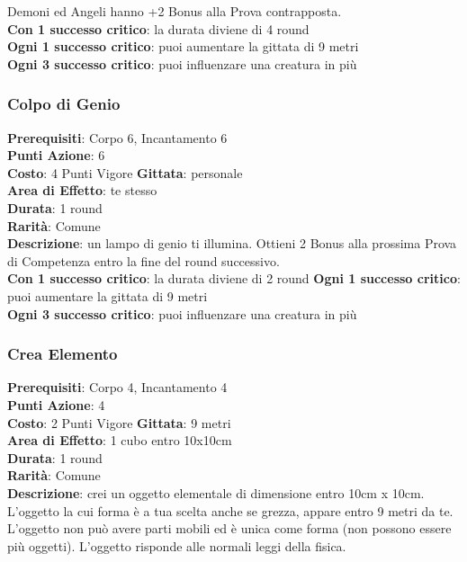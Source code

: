 \documentclass[12pt,a4paper,twoside,openany]{book}
\begin{document}
\begin{multicols}{2}
Demoni ed Angeli hanno +2 Bonus alla Prova contrapposta.\\
\textbf{Con 1 successo critico}: la durata diviene di 4 round\\
\textbf{Ogni 1 successo critico}: puoi aumentare la gittata di 9 metri\\
\textbf{Ogni 3 successo critico}: puoi influenzare una creatura in più


\subsubsection*{Colpo di Genio}
\textbf{Prerequisiti}: Corpo 6, Incantamento 6\\
\textbf{Punti Azione}: 6\\
\textbf{Costo}: 4 Punti Vigore
\textbf{Gittata}: personale\\
\textbf{Area di Effetto}: te stesso\\
\textbf{Durata}: 1 round\\
\textbf{Rarità}: Comune\\
\textbf{Descrizione}: un lampo di genio ti illumina. 
Ottieni 2 Bonus alla prossima Prova di Competenza entro la fine del round successivo.\\
\textbf{Con 1 successo critico}: la durata diviene di 2 round
\textbf{Ogni 1 successo critico}: puoi aumentare la gittata di 9 metri\\
\textbf{Ogni 3 successo critico}: puoi influenzare una creatura in più

\subsubsection*{Crea Elemento}
\textbf{Prerequisiti}: Corpo 4, Incantamento 4\\
\textbf{Punti Azione}: 4\\
\textbf{Costo}: 2 Punti Vigore
\textbf{Gittata}: 9 metri\\
\textbf{Area di Effetto}: 1 cubo entro 10x10cm\\
\textbf{Durata}: 1 round\\
\textbf{Rarità}: Comune\\
\textbf{Descrizione}: crei un oggetto elementale di dimensione entro 10cm x 10cm.
L'oggetto la cui forma è a tua scelta anche se grezza, appare entro 9 metri da te. 
L'oggetto non può avere parti mobili ed è unica come forma (non possono essere più oggetti). L'oggetto risponde alle normali leggi della fisica.


\end{multicols}
\end{document}
